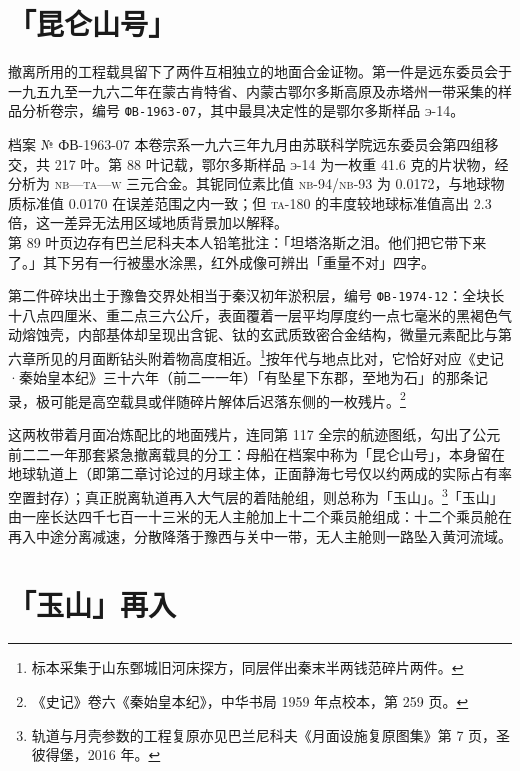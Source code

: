 \section{「昆仑山号」}

撤离所用的工程载具留下了两件互相独立的地面合金证物。第一件是远东委员会于一九五九至一九六二年在蒙古肯特省、内蒙古鄂尔多斯高原及赤塔州一带采集的样品分析卷宗，编号 \texttt{ФВ-1963-07}，其中最具决定性的是鄂尔多斯样品 \textsc{э}-14。

\begin{archive}{档案 № ФВ-1963-07}
本卷宗系一九六三年九月由苏联科学院远东委员会第四组移交，共 217 叶。第 88 叶记载，鄂尔多斯样品 \textsc{э}-14 为一枚重 41.6 克的片状物，经分析为 \textsc{nb}—\textsc{ta}—\textsc{w} 三元合金。其铌同位素比值 \textsc{nb}-94/\textsc{nb}-93 为 0.0172，与地球物质标准值 0.0170 在误差范围之内一致；但 \textsc{ta}-180 的丰度较地球标准值高出 2.3 倍，这一差异无法用区域地质背景加以解释。\\
第 89 叶页边存有巴兰尼科夫本人铅笔批注：「坦塔洛斯之泪。他们把它带下来了。」其下另有一行被墨水涂黑，红外成像可辨出「重量不对」四字。
\end{archive}

第二件碎块出土于豫鲁交界处相当于秦汉初年淤积层，编号 \mbox{\texttt{ФВ-1974-12}：}全块长十八点四厘米、重二点三六公斤，表面覆着一层平均厚度约一点七毫米的黑褐色气动熔蚀壳，内部基体却呈现出含铌、钛的玄武质致密合金结构，微量元素配比与第六章所见的月面断钻头附着物高度相近。\footnote{标本采集于山东鄄城旧河床探方，同层伴出秦末半两钱范碎片两件。}按年代与地点比对，它恰好对应《史记·秦始皇本纪》三十六年（前二一一年）「有坠星下东郡，至地为石」的那条记录，极可能是高空载具或伴随碎片解体后迟落东侧的一枚残片。\footnote{《史记》卷六《秦始皇本纪》，中华书局 1959 年点校本，第 259 页。}

这两枚带着月面冶炼配比的地面残片，连同第 117 全宗的航迹图纸，勾出了公元前二二一年那套紧急撤离载具的分工：母船在档案中称为「昆仑山号」，本身留在地球轨道上（即第二章讨论过的月球主体，正面静海七号仅以约两成的实际占有率空置封存）；真正脱离轨道再入大气层的着陆舱组，则总称为「玉山」。\footnote{轨道与月壳参数的工程复原亦见巴兰尼科夫《月面设施复原图集》第 7 页，圣彼得堡，2016 年。}「玉山」由一座长达四千七百一十三米的无人主舱加上十二个乘员舱组成：十二个乘员舱在再入中途分离减速，分散降落于豫西与关中一带，无人主舱则一路坠入黄河流域。

\section{「玉山」再入}

